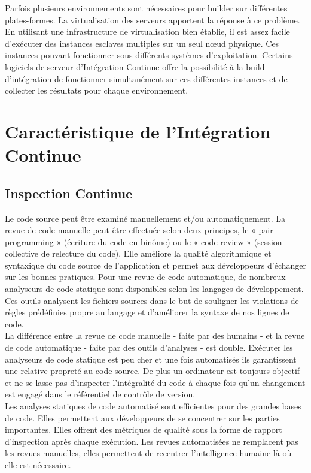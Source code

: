     Parfois plusieurs environnements sont nécessaires pour builder sur différentes plates-formes. La virtualisation des serveurs apportent la réponse à ce problème. En utilisant une infrastructure de virtualisation bien établie, il est assez facile d’exécuter des instances esclaves multiples sur un seul nœud physique. Ces instances pouvant fonctionner sous différents systèmes d’exploitation. Certains logiciels de serveur d’Intégration Continue offre la possibilité à la build d’intégration de fonctionner simultanément sur ces différentes instances et de collecter les résultats pour chaque environnement.\\

  \section{Caractéristique de l’Intégration Continue}\label{Features of Continuous Integration}
    \subsection{Inspection Continue}
    Le code source peut être examiné manuellement et/ou automatiquement. La revue de code manuelle peut être effectuée selon deux principes, le « pair programming » (écriture du code en binôme) ou le « code review » (session collective de relecture du code). Elle améliore la qualité algorithmique et syntaxique du code source de l’application et permet aux développeurs d’échanger sur les bonnes pratiques. Pour une revue de code automatique, de nombreux analyseurs de code statique sont disponibles selon les langages de développement. Ces outils analysent les fichiers sources dans le but de souligner les violations de règles prédéfinies propre au langage et d’améliorer la syntaxe de nos lignes de code.\\

    La différence entre la revue de code manuelle - faite par des humains - et la revue de code automatique - faite par des outils d’analyses - est double. Exécuter les analyseurs de code statique est peu cher et une fois automatisés ils garantissent une relative propreté au code source. De plus un ordinateur est toujours objectif et ne se lasse pas d’inspecter l’intégralité du code à chaque fois qu’un changement est engagé dans le référentiel de contrôle de version.\\

    Les analyses statiques de code automatisé sont efficientes pour des grandes bases de code. Elles permettent aux développeurs de se concentrer sur les parties importantes. Elles offrent des métriques de qualité sous la forme de rapport d’inspection après chaque exécution. Les revues automatisées ne remplacent pas les revues manuelles, elles permettent de recentrer l’intelligence humaine là où elle est nécessaire.\\

